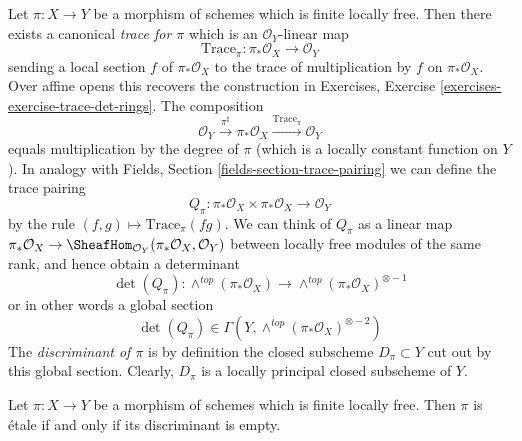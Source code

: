 \medskip\noindent
Let $\pi : X \to Y$ be a morphism of schemes which is finite locally
free. Then there exists a canonical {\it trace for $\pi$}
which is an $\mathcal{O}_Y$-linear map
$$
\text{Trace}_\pi : \pi_*\mathcal{O}_X \longrightarrow \mathcal{O}_Y
$$
sending a local section $f$ of $\pi_*\mathcal{O}_X$ to the
trace of multiplication by $f$ on $\pi_*\mathcal{O}_X$. Over
affine opens this recovers the construction in
Exercises, Exercise \ref{exercises-exercise-trace-det-rings}.
The composition
$$
\mathcal{O}_Y \xrightarrow{\pi^\sharp} \pi_*\mathcal{O}_X
\xrightarrow{\text{Trace}_\pi} \mathcal{O}_Y
$$
equals multiplication by the degree of $\pi$ (which is a locally constant
function on $Y$). In analogy with
Fields, Section \ref{fields-section-trace-pairing}
we can define the trace pairing
$$
Q_\pi :
\pi_*\mathcal{O}_X \times \pi_*\mathcal{O}_X
\longrightarrow
\mathcal{O}_Y
$$
by the rule $(f, g) \mapsto \text{Trace}_\pi(fg)$. We can think of
$Q_\pi$ as a linear map
$\pi_*\mathcal{O}_X \to
\SheafHom_{\mathcal{O}_Y}(\pi_*\mathcal{O}_X, \mathcal{O}_Y)$
between locally free modules of the same rank, and hence obtain
a determinant
$$
\det(Q_\pi) :
\wedge^{top}(\pi_*\mathcal{O}_X)
\longrightarrow
\wedge^{top}(\pi_*\mathcal{O}_X)^{\otimes -1}
$$
or in other words a global section
$$
\det(Q_\pi) \in \Gamma(Y, \wedge^{top}(\pi_*\mathcal{O}_X)^{\otimes -2})
$$
The {\it discriminant of $\pi$} is by definition the closed
subscheme $D_\pi \subset Y$ cut out by this global section.
Clearly, $D_\pi$ is a locally principal closed subscheme of $Y$.

\begin{lemma}
\label{lemma-discriminant}
Let $\pi : X \to Y$ be a morphism of schemes which is finite locally
free. Then $\pi$ is \'etale if and only if its discriminant is empty.
\end{lemma}


